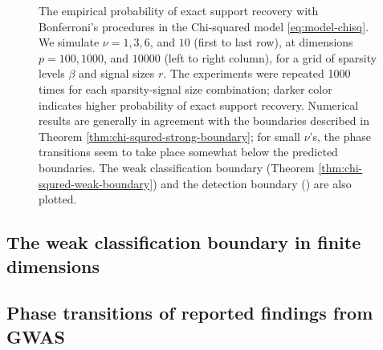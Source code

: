 \begin{figure}
      \caption{The empirical probability of exact support recovery with Bonferroni's procedures in the Chi-squared model \eqref{eq:model-chisq}. 
      We simulate $\nu=1, 3, 6$, and $10$ (first to last row), at dimensions $p=100, 1000$, and $10000$ (left to right column), for a grid of sparsity levels $\beta$ and signal sizes $r$.
      The experiments were repeated 1000 times for each sparsity-signal size combination; darker color indicates higher probability of exact support recovery.  
      Numerical results are generally in agreement with the boundaries described in Theorem \ref{thm:chi-squred-strong-boundary}; for small $\nu$'s, the phase transitions seem to take place somewhat below the predicted boundaries.
      The weak classification boundary (Theorem \ref{thm:chi-squred-weak-boundary}) and the detection boundary (\citep{donoho2004higher}) are also plotted.} 
      \label{fig:phase-simulated-chi-squared}
\end{figure}



\subsection{The weak classification boundary in finite dimensions}


\subsection{Phase transitions of reported findings from GWAS}